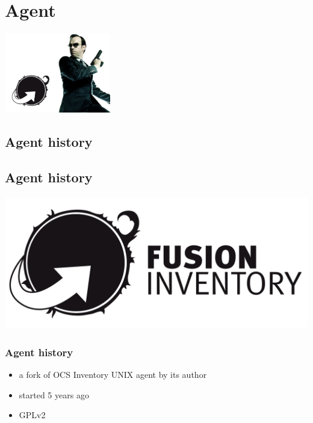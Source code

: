 %
\section{Agent}
\includegraphics[height=3.5cm]{./pics/agent-smith.jpg}
\subsection{Agent history}
\subsection{Agent history}
\begin{frame}
\includegraphics[height=5.8cm,transparent]{pics/fusioninventory-logo.pdf}
\end{frame}

\begin{frame}
\frametitle{Agent history}

\begin{itemize}
%
\item a fork of OCS Inventory UNIX agent by its author
\item started 5 years ago
\item GPLv2
%
\end{itemize}
\end{frame}

